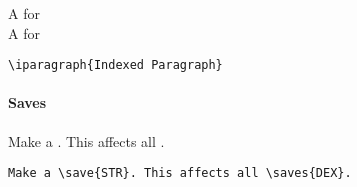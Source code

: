 \documentclass[itdr]{subfiles}
\begin{document}
\fbox{\lstinline!\\tsub\{\}!} A  for \fbox{\lstinline!\\textsubscript\{\}!}\\
\fbox{\lstinline!\\tsup\{\}!} A  for \fbox{\lstinline!\\textsuperscript\{\}!}\\

\vfill
{}
\begin{lstlisting}
\iparagraph{Indexed Paragraph}
\end{lstlisting}

\vfill
\paragraph{Saves}

Make a . This affects all .

\begin{lstlisting}
Make a \save{STR}. This affects all \saves{DEX}.
\end{lstlisting}

\vfill
\end{document}
